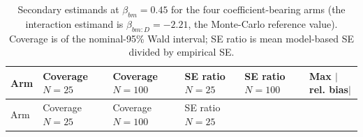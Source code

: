 \documentclass[
  11pt,
]{article}
\begin{document}
\begin{longtable}[]{@{}
  >{\raggedright\arraybackslash}p{}
  >{\raggedright\arraybackslash}p{}
  >{\raggedright\arraybackslash}p{}
  >{\raggedright\arraybackslash}p{}
  >{\raggedright\arraybackslash}p{}
  >{\raggedright\arraybackslash}p{}@{}}
\caption{\label{tab:secondary} Secondary estimands at \(\beta_{bm} = 0.45\)
for the four coefficient-bearing arms (the interaction estimand
is \(\beta_{bm:D} = -2.21\), the Monte-Carlo reference value).
Coverage is of the nominal-95\% Wald interval; SE ratio is mean
model-based SE divided by empirical SE.}\tabularnewline
\toprule\noalign{}
\begin{minipage}[b]{\linewidth}\raggedright
Arm
\end{minipage} & \begin{minipage}[b]{\linewidth}\raggedright
Coverage \(N=25\)
\end{minipage} & \begin{minipage}[b]{\linewidth}\raggedright
Coverage \(N=100\)
\end{minipage} & \begin{minipage}[b]{\linewidth}\raggedright
SE ratio \(N=25\)
\end{minipage} & \begin{minipage}[b]{\linewidth}\raggedright
SE ratio \(N=100\)
\end{minipage} & \begin{minipage}[b]{\linewidth}\raggedright
Max \(|\)rel. bias\(|\)
\end{minipage} \\
\midrule\noalign{}
\endfirsthead
\toprule\noalign{}
\begin{minipage}[b]{\linewidth}\raggedright
Arm
\end{minipage} & \begin{minipage}[b]{\linewidth}\raggedright
Coverage \(N=25\)
\end{minipage} & \begin{minipage}[b]{\linewidth}\raggedright
Coverage \(N=100\)
\end{minipage} & \begin{minipage}[b]{\linewidth}\raggedright
SE ratio \(N=25\)
\end{minipage} & \begin{minipage}[b]{\linewidth}\raggedright

\end{minipage}
\end{longtable}
\end{document}
